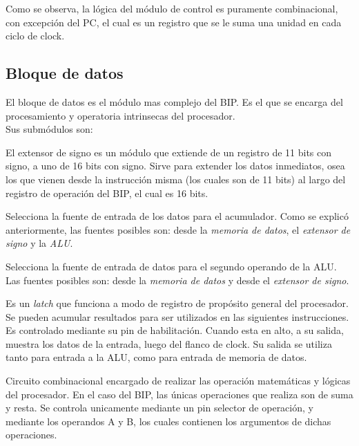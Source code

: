 \documentclass{article}
\begin{document}
Como se observa, la lógica del módulo de control es puramente combinacional, con excepción del
PC, el cual es un registro que se le suma una unidad en cada ciclo de clock.

\newpage

\subsection{Bloque de datos}

El bloque de datos es el módulo mas complejo del BIP. Es el que se encarga del procesamiento y operatoria
intrinsecas del procesador.\\

\noindent Sus submódulos son:
\begin{description}[font=$\bullet$~\normalfont\scshape\color{red!50!black}]
\item [Extensor de signo] El extensor de signo es un módulo que extiende de un registro
de 11 bits con signo, a uno de 16 bits con signo. Sirve para extender los datos inmediatos, osea
los que vienen desde la instrucción misma (los cuales son de 11 bits) al largo del registro de
operación del BIP, el cual es 16 bits.
\item [Selector A] Selecciona la fuente de entrada de los datos para el acumulador. Como se explicó
anteriormente, las fuentes posibles son: desde la \textit{memoria de datos}, el \textit{extensor de signo} y la \textit{ALU}.
\item [Selector B] Selecciona la fuente de entrada de datos para el segundo operando de la ALU.
Las fuentes posibles son: desde la \textit{memoria de datos} y desde el \textit{extensor de signo}.
\item [Acumulador] Es un \textit{latch} que funciona a modo de registro de propósito general del
procesador. Se pueden acumular resultados para ser utilizados en las siguientes instrucciones. Es controlado mediante su pin de habilitación. Cuando esta en alto, a su salida, muestra los datos de la entrada, luego del flanco de clock. Su salida se utiliza tanto para entrada a la ALU, como para entrada
de memoria de datos.
\item [ALU] Circuito combinacional encargado de realizar las operación matemáticas y lógicas del procesador. En el caso del BIP, las únicas operaciones que realiza son de suma y resta. Se controla
unicamente mediante un pin selector de operación, y mediante los operandos A y B, los cuales contienen
los argumentos de dichas operaciones.
\end{description}
\end{document}
